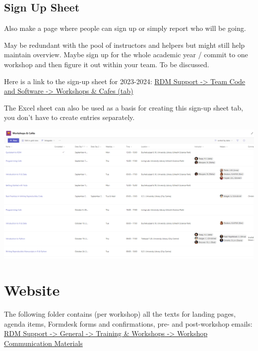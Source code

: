 \documentclass[
  letterpaper,
  DIV=11,
  numbers=noendperiod]{scrreprt}
\begin{document}
\subsection*{Sign Up Sheet}\label{sign-up-sheet}

Also make a page where people can sign up or simply report who will be
going.

May be redundant with the pool of instructors and helpers but might
still help maintain overview. Maybe sign up for the whole academic year
/ commit to one workshop and then figure it out within your team. To be
discussed.

Here is a link to the sign-up sheet for 2023-2024:
\href{https://teams.microsoft.com/l/entity/26bc2873-6023-480c-a11b-76b66605ce8c/_djb2_msteams_prefix_1765026388?context=\%7B\%22channelId\%22\%3A\%2219\%3Aa5f3eb9fa731402c91171d0ef1eed535\%40thread.skype\%22\%7D&tenantId=d72758a0-a446-4e0f-a0aa-4bf95a4a10e7}{RDM
Support -\textgreater{} Team Code and Software -\textgreater{} Workshops
\& Cafes (tab)}

The Excel sheet can also be used as a basis for creating this sign-up
sheet tab, you don't have to create entries separately.

\includegraphics{images/sign-up-sheet.PNG}

\section*{Website}\label{website}


The following folder contains (per workshop) all the texts for landing
pages, agenda items, Formdesk forms and confirmations, pre- and
post-workshop emails:
\href{https://solisservices.sharepoint.com/:f:/r/sites/RDMSpeeltuin/Shared\%20Documents/General/Trainings\%20and\%20Workshops/Workshop\%20Communication\%20Materials?csf=1&web=1&e=dab1La}{RDM
Support -\textgreater{} General -\textgreater{} Training \& Workshops
-\textgreater{} Workshop Communication Materials}
\end{document}
